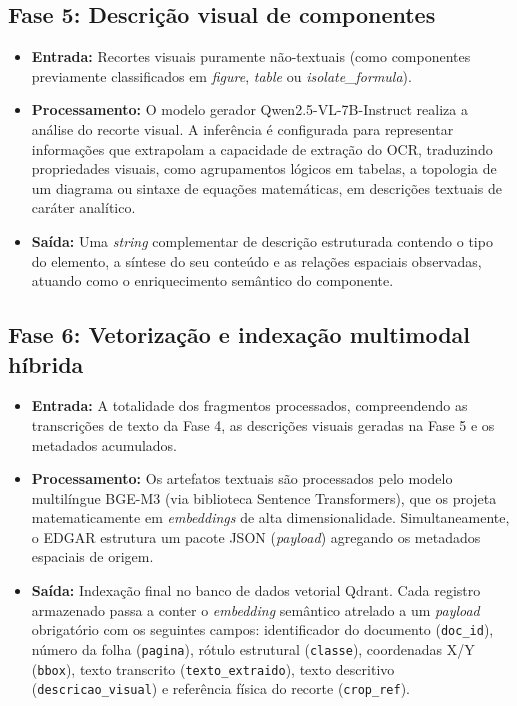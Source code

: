 \subsection{Fase 5: Descrição visual de componentes}
\label{subsec:fase5_descricao_visual}

\begin{itemize}
    \item \textbf{Entrada:} Recortes visuais puramente não-textuais (como componentes previamente classificados em \textit{figure}, \textit{table} ou \textit{isolate\_formula}).
    \item \textbf{Processamento:} O modelo gerador Qwen2.5-VL-7B-Instruct realiza a análise do recorte visual. A inferência é configurada para representar informações que extrapolam a capacidade de extração do OCR, traduzindo propriedades visuais, como agrupamentos lógicos em tabelas, a topologia de um diagrama ou sintaxe de equações matemáticas, em descrições textuais de caráter analítico.
    \item \textbf{Saída:} Uma \textit{string} complementar de descrição estruturada contendo o tipo do elemento, a síntese do seu conteúdo e as relações espaciais observadas, atuando como o enriquecimento semântico do componente.
\end{itemize}

\subsection{Fase 6: Vetorização e indexação multimodal híbrida}
\label{subsec:fase6_indexacao_hibrida}

\begin{itemize}
    \item \textbf{Entrada:} A totalidade dos fragmentos processados, compreendendo as transcrições de texto da Fase 4, as descrições visuais geradas na Fase 5 e os metadados acumulados.
    \item \textbf{Processamento:} Os artefatos textuais são processados pelo modelo multilíngue BGE-M3 (via biblioteca Sentence Transformers), que os projeta matematicamente em \textit{embeddings} de alta dimensionalidade. Simultaneamente, o EDGAR estrutura um pacote JSON (\textit{payload}) agregando os metadados espaciais de origem.
    \item \textbf{Saída:} Indexação final no banco de dados vetorial Qdrant. Cada registro armazenado passa a conter o \textit{embedding} semântico atrelado a um \textit{payload} obrigatório com os seguintes campos: identificador do documento (\texttt{doc\_id}), número da folha (\texttt{pagina}), rótulo estrutural (\texttt{classe}), coordenadas X/Y (\texttt{bbox}), texto transcrito (\texttt{texto\_extraido}), texto descritivo (\texttt{descricao\_visual}) e referência física do recorte (\texttt{crop\_ref}).
\end{itemize}

